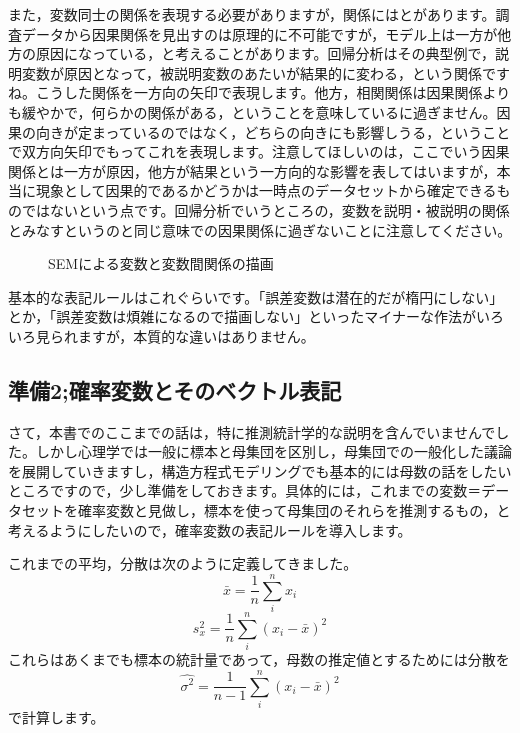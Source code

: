 \documentclass{ltjsbook}
\begin{document}
また，変数同士の関係を表現する必要がありますが，関係にはとがあります。調査データから因果関係を見出すのは原理的に不可能ですが，モデル上は一方が他方の原因になっている，と考えることがあります。回帰分析はその典型例で，説明変数が原因となって，被説明変数のあたいが結果的に変わる，という関係ですね。こうした関係を一方向の矢印で表現します。他方，相関関係は因果関係よりも緩やかで，何らかの関係がある，ということを意味しているに過ぎません。因果の向きが定まっているのではなく，どちらの向きにも影響しうる，ということで双方向矢印でもってこれを表現します。注意してほしいのは，ここでいう因果関係とは一方が原因，他方が結果という一方向的な影響を表してはいますが，本当に現象として因果的であるかどうかは一時点のデータセットから確定できるものではないという点です。回帰分析でいうところの，変数を説明・被説明の関係とみなすというのと同じ意味での因果関係に過ぎないことに注意してください。

\begin{figure}[ht]
	\caption{SEMによる変数と変数間関係の描画}
\end{figure}

基本的な表記ルールはこれぐらいです。「誤差変数は潜在的だが楕円にしない」とか，「誤差変数は煩雑になるので描画しない」といったマイナーな作法がいろいろ見られますが，本質的な違いはありません。

\subsection{準備2;確率変数とそのベクトル表記}
さて，本書でのここまでの話は，特に推測統計学的な説明を含んでいませんでした。しかし心理学では一般に標本と母集団を区別し，母集団での一般化した議論を展開していきますし，構造方程式モデリングでも基本的には母数の話をしたいところですので，少し準備をしておきます。具体的には，これまでの変数＝データセットを確率変数と見做し，標本を使って母集団のそれらを推測するもの，と考えるようにしたいので，確率変数の表記ルールを導入します。

これまでの平均，分散は次のように定義してきました。
\[ \bar{x} = \frac{1}{n}\sum_i^n x_i \]
\[ s_x^2 = \frac{1}{n} \sum_i^n (x_i - \bar{x})^2 \]
これらはあくまでも標本の統計量であって，母数の推定値とするためには分散を
\[ \hat{\sigma^2} = \frac{1}{n-1}\sum_i^n  (x_i - \bar{x})^2 \]
で計算します。
\end{document}
